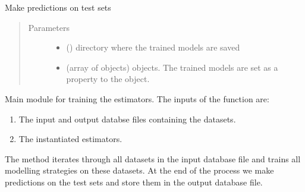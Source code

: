 \documentclass[letterpaper,10pt,english]{sphinxmanual}
\begin{document}
\begin{fulllineitems}
\begin{fulllineitems}
\label{\detokenize{experiments:mleap.experiments.orchestrator.Orchestrator.predict_all}}
Make predictions on test sets
\begin{quote}\begin{description}
\item[{Parameters}] \leavevmode\begin{itemize}
\item {} 
 () \textendash{} directory where the trained models are saved

\item {} 
 (array of {\hyperref[\detokenize{estimators:mleap-estimator-label}]{}} objects) \textendash{} {\hyperref[\detokenize{estimators:mleap-estimator-label}]{}} objects. The trained models are set as a property to the object.

\end{itemize}

\end{description}\end{quote}

\end{fulllineitems}


\begin{fulllineitems}
\label{\detokenize{experiments:mleap.experiments.orchestrator.Orchestrator.run}}
Main module for training the estimators. 
The inputs of the function are:
\begin{enumerate}
\item {} 
The input and output databse files containing the datasets.

\item {} 
The instantiated estimators.

\end{enumerate}

The method iterates through all datasets in the input database file 
and trains all modelling strategies on these datasets. At the end of the process 
we make predictions on the test sets and store them in the output database file.


\end{fulllineitems}
\end{fulllineitems}
\end{document}

